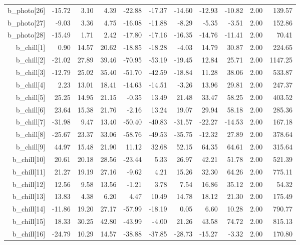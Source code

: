 \documentclass[11pt]{article}
\begin{document}
\begin{table}[ht]
\begin{tabular}{rrrrrrrrrrr}
  b\_photo[26] & -15.72 & 3.10 & 4.39 & -22.88 & -17.37 & -14.60 & -12.93 & -10.82 & 2.00 & 139.57 \\ 
  b\_photo[27] & -9.03 & 3.36 & 4.75 & -16.08 & -11.88 & -8.29 & -5.35 & -3.51 & 2.00 & 152.86 \\ 
  b\_photo[28] & -15.49 & 1.71 & 2.42 & -17.80 & -17.16 & -16.35 & -14.76 & -11.41 & 2.00 & 70.41 \\ 
  b\_chill[1] & 0.90 & 14.57 & 20.62 & -18.85 & -18.28 & -4.03 & 14.79 & 30.87 & 2.00 & 224.65 \\ 
  b\_chill[2] & -21.02 & 27.89 & 39.46 & -70.95 & -53.19 & -19.45 & 12.84 & 25.71 & 2.00 & 1147.25 \\ 
  b\_chill[3] & -12.79 & 25.02 & 35.40 & -51.70 & -42.59 & -18.84 & 11.28 & 38.06 & 2.00 & 533.87 \\ 
  b\_chill[4] & 2.23 & 13.01 & 18.41 & -14.63 & -14.51 & -3.26 & 13.96 & 29.81 & 2.00 & 247.37 \\ 
  b\_chill[5] & 25.25 & 14.95 & 21.15 & -0.35 & 13.49 & 21.48 & 33.47 & 58.25 & 2.00 & 403.52 \\ 
  b\_chill[6] & 23.64 & 15.38 & 21.76 & -2.16 & 13.24 & 19.07 & 29.94 & 58.18 & 2.00 & 285.36 \\ 
  b\_chill[7] & -31.98 & 9.47 & 13.40 & -50.40 & -40.83 & -31.57 & -22.27 & -14.53 & 2.00 & 167.18 \\ 
  b\_chill[8] & -25.67 & 23.37 & 33.06 & -58.76 & -49.53 & -35.75 & -12.32 & 27.89 & 2.00 & 378.64 \\ 
  b\_chill[9] & 44.97 & 15.48 & 21.90 & 11.12 & 32.68 & 52.15 & 64.35 & 64.61 & 2.00 & 315.64 \\ 
  b\_chill[10] & 20.61 & 20.18 & 28.56 & -23.44 & 5.33 & 26.97 & 42.21 & 51.78 & 2.00 & 521.39 \\ 
  b\_chill[11] & 21.27 & 19.19 & 27.16 & -9.62 & 4.21 & 15.26 & 32.30 & 64.26 & 2.00 & 775.11 \\ 
  b\_chill[12] & 12.56 & 9.58 & 13.56 & -1.21 & 3.78 & 7.54 & 16.86 & 35.12 & 2.00 & 54.32 \\ 
  b\_chill[13] & 13.83 & 4.38 & 6.20 & 4.47 & 10.49 & 14.78 & 18.12 & 21.30 & 2.00 & 175.49 \\ 
  b\_chill[14] & -11.86 & 19.20 & 27.17 & -57.99 & -18.19 & 0.05 & 6.60 & 10.28 & 2.00 & 790.77 \\ 
  b\_chill[15] & 18.33 & 30.25 & 42.80 & -43.99 & -4.00 & 21.26 & 43.58 & 74.72 & 2.00 & 815.13 \\ 
  b\_chill[16] & -24.79 & 10.29 & 14.57 & -38.88 & -37.85 & -28.73 & -15.27 & -3.32 & 2.00 & 170.80 \\ 

\end{tabular}
\end{table}
\end{document}
